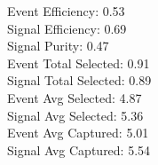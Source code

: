 Event  Efficiency:     0.53\\
Signal Efficiency:     0.69\\
Signal Purity:         0.47\\
Event  Total Selected: 0.91\\
Signal Total Selected: 0.89\\
Event  Avg Selected:   4.87\\
Signal Avg Selected:   5.36\\
Event  Avg Captured:   5.01\\
Signal Avg Captured:   5.54